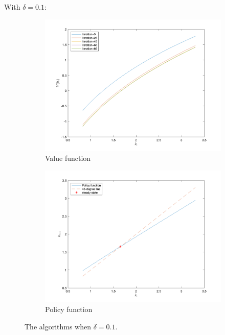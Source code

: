 \documentclass[10pt,a4paper]{article}
\begin{document}
With $\delta=0.1$:
\begin{figure}[ht]
\centering
\begin{subfigure}[b]{0.49\linewidth}
\includegraphics[width=\linewidth]{figs/delta01valfun.png}
\caption{Value function}
\end{subfigure}
\begin{subfigure}[b]{0.49\linewidth}
\includegraphics[width=\linewidth]{figs/delta01policyfun.png}
\caption{Policy function}
\end{subfigure}
\caption{The algorithms when $\delta=0.1$.}
\label{fig:delta1}
\end{figure}
\end{document}
